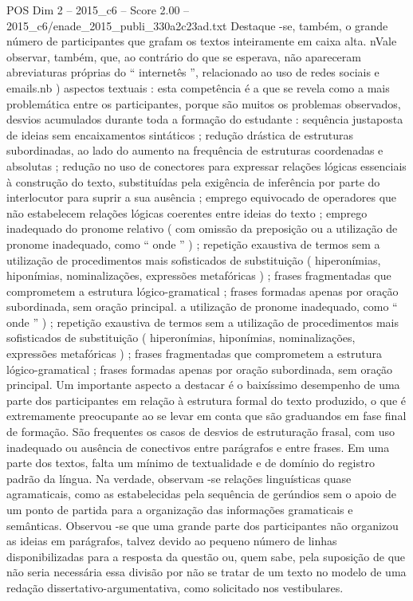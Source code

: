\begin{textsample}{POS Dim 2 – 2015\_c6 – Score 2.00 – 2015\_c6/enade\_2015\_publi\_330a2c23ad.txt}
Destaque -se, também, o grande número de participantes que grafam os textos inteiramente em caixa alta. nVale observar, também, que, ao contrário do que se esperava, não apareceram abreviaturas próprias do “ internetês ”, relacionado ao uso de redes sociais e emails.nb ) aspectos textuais : esta competência é a que se revela como a mais problemática entre os participantes, porque são muitos os problemas observados, desvios acumulados durante toda a formação do estudante : sequência justaposta de ideias sem encaixamentos sintáticos ; redução drástica de estruturas subordinadas, ao lado do aumento na frequência de estruturas coordenadas e absolutas ; redução no uso de conectores para expressar relações lógicas essenciais à construção do texto, substituídas pela exigência de inferência por parte do interlocutor para suprir a sua ausência ; emprego equivocado de operadores que não estabelecem relações lógicas coerentes entre ideias do texto ; emprego inadequado do pronome relativo ( com omissão da preposição ou a utilização de pronome inadequado, como “ onde ” ) ; repetição exaustiva de termos sem a utilização de procedimentos mais sofisticados de substituição ( hiperonímias, hiponímias, nominalizações, expressões metafóricas ) ; frases fragmentadas que comprometem a estrutura lógico-gramatical ; frases formadas apenas por oração subordinada, sem oração principal. a utilização de pronome inadequado, como “ onde ” ) ; repetição exaustiva de termos sem a utilização de procedimentos mais sofisticados de substituição ( hiperonímias, hiponímias, nominalizações, expressões metafóricas ) ; frases fragmentadas que comprometem a estrutura lógico-gramatical ; frases formadas apenas por oração subordinada, sem oração principal.
Um importante aspecto a destacar é o baixíssimo desempenho de uma parte dos participantes em relação à estrutura formal do texto produzido, o que é extremamente preocupante ao se levar em conta que são graduandos em fase final de formação.
São frequentes os casos de desvios de estruturação frasal, com uso inadequado ou ausência de conectivos entre parágrafos e entre frases.
Em uma parte dos textos, falta um mínimo de textualidade e de domínio do registro padrão da língua.
Na verdade, observam -se relações linguísticas quase agramaticais, como as estabelecidas pela sequência de gerúndios sem o apoio de um ponto de partida para a organização das informações gramaticais e semânticas.
Observou -se que uma grande parte dos participantes não organizou as ideias em parágrafos, talvez devido ao pequeno número de linhas disponibilizadas para a resposta da questão ou, quem sabe, pela suposição de que não seria necessária essa divisão por não se tratar de um texto no modelo de uma redação dissertativo-argumentativa, como solicitado nos vestibulares.

\end{textsample}
